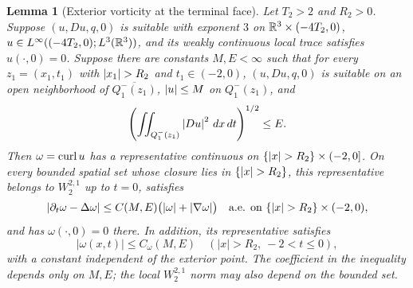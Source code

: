 \documentclass[11pt,letterpaper]{article}
\numberwithin{equation}{section}
\theoremstyle{plain}
\newtheorem{lemma}[theorem]{Lemma}
\theoremstyle{definition}
\theoremstyle{remark}
\begin{document}
\begin{lemma}[Exterior vorticity at the terminal face]\label{lem:vorticity-top-extension}
Let $T_2>2$ and $R_2>0$. Suppose $(u,Du,q,0)$ is suitable with exponent
$3$ on $\mathbb{R}^3\times(-4T_2,0)$, $u\in L^\infty((-4T_2,0);L^3(\mathbb{R}^3))$,
and its weakly continuous local trace satisfies $u(\cdot,0)=0$. Suppose
there are constants $M,E<\infty$ such that for every
$z_1=(x_1,t_1)$ with $\left\lvert x_1\right\rvert>R_2$ and $t_1\in(-2,0)$,
$(u,Du,q,0)$ is suitable on an open neighborhood of
$\overline{Q_1^-(z_1)}$, $\left\lvert u\right\rvert\le M$ on $Q_1^-(z_1)$, and
\[
 \left(\iint_{Q_1^-(z_1)}\left\lvert Du\right\rvert^2\,dx\,dt\right)^{1/2}\le E.
\]
Then $\omega=\operatorname{curl} u$ has a representative continuous on
$\{\left\lvert x\right\rvert>R_2\}\times(-2,0]$. On every bounded spatial set whose closure
lies in $\{\left\lvert x\right\rvert>R_2\}$, this representative belongs to
$W^{2,1}_2$ up to $t=0$, satisfies
\begin{equation}\label{eq:exterior-vorticity-inequality}
 \left\lvert \partial_t\omega-\Delta\omega\right\rvert
 \le C(M,E)\bigl(\left\lvert \omega\right\rvert+\left\lvert \nabla\omega\right\rvert\bigr)
 \quad\text{a.e. on }\{\left\lvert x\right\rvert>R_2\}\times(-2,0),
\end{equation}
and has $\omega(\cdot,0)=0$ there. In addition, its representative satisfies
\[
 |\omega(x,t)|\le C_\omega(M,E)
 \quad (|x|>R_2,\ -2<t\le0),
\]
with a constant independent of the exterior point. The coefficient in the
inequality depends only on $M,E$; the local $W^{2,1}_2$ norm may also depend
on the bounded set.
\end{lemma}
\end{document}
